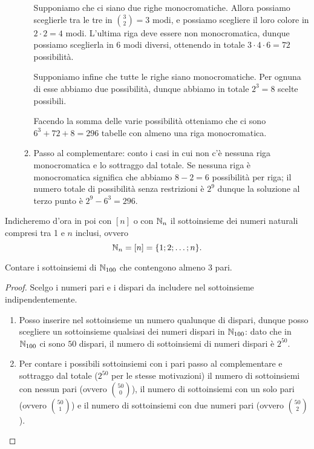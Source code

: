 \begin{solution}
\begin{enumerate}
\begin{enumerate}[1.]
            Supponiamo che ci siano due righe monocromatiche. Allora possiamo sceglierle tra le tre in $\binom{3}{2} = 3$ modi, e possiamo scegliere il loro colore in $2\cdot2 = 4$ modi. L'ultima riga deve essere non monocromatica, dunque possiamo sceglierla in $6$ modi diversi, ottenendo in totale $3 \cdot 4 \cdot 6 = 72$ possibilità.

            Supponiamo infine che tutte le righe siano monocromatiche. Per ognuna di esse abbiamo due possibilità, dunque abbiamo in totale $2^3 = 8$ scelte possibili.

            Facendo la somma delle varie possibilità otteniamo che ci sono $6^3 + 72 + 8 = 296$ tabelle con almeno una riga monocromatica.
            \item Passo al complementare: conto i casi in cui non c'è nessuna riga monocromatica e lo sottraggo dal totale. Se nessuna riga è monocromatica significa che abbiamo $8 - 2 = 6$ possibilità per riga; il numero totale di possibilità senza restrizioni è $2^9$ dunque la soluzione al terzo punto è $2^9 - 6^3 = 296$.
        \end{enumerate}
    \end{enumerate}
\end{solution}

\begin{definition}
    Indicheremo d'ora in poi con $[n]$ o con $\mathbb{N}_n$ il sottoinsieme dei numeri naturali compresi tra 1 e $n$ inclusi, ovvero \begin{equation}
        \mathbb{N}_{n} = [n] = \{1; 2; \dots; n\}.
    \end{equation}
\end{definition}

\begin{example}
    Contare i sottoinsiemi di $\mathbb{N}_{100}$ che contengono almeno $3$ pari.
\end{example}
\begin{proof}
    Scelgo i numeri pari e i dispari da includere nel sottoinsieme indipendentemente.
    \begin{enumerate}
        \item Posso inserire nel sottoinsieme un numero qualunque di dispari, dunque posso scegliere un sottoinsieme qualsiasi dei numeri dispari in $\mathbb{N}_{100}$: dato che in $\mathbb{N}_{100}$ ci sono $50$ dispari, il numero di sottoinsiemi di numeri dispari è $2^50$.
        \item Per contare i possibili sottoinsiemi con i pari passo al complementare e sottraggo dal totale ($2^50$ per le stesse motivazioni) il numero di sottoinsiemi con nessun pari (ovvero $\binom{50}{0}$), il numero di sottoinsiemi con un solo pari (ovvero $\binom{50}{1}$) e il numero di sottoinsiemi con due numeri pari (ovvero $\binom{50}{2}$).
    \end{enumerate}
\end{proof}

